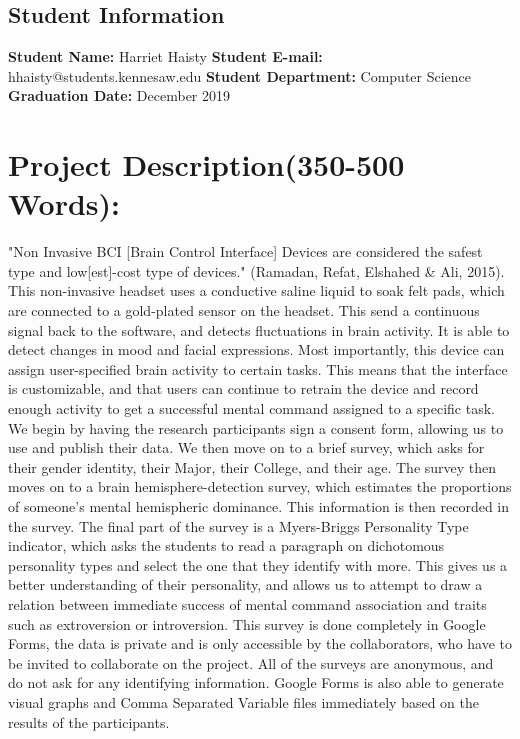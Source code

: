 \documentclass{article}
\begin{document}
\subsection*{Student Information}
\textbf{Student Name:} Harriet Haisty \newline
\textbf{Student E-mail:} hhaisty@students.kennesaw.edu \newline
\textbf{Student Department:} Computer Science \newline
\textbf{Graduation Date:} December 2019

\section*{Project Description(350-500 Words):}
"Non Invasive BCI [Brain Control Interface] Devices are considered the safest type and low[est]-cost type of devices." (Ramadan, Refat, Elshahed & Ali, 2015). This non-invasive headset uses a conductive saline liquid to soak felt pads, which are connected to a gold-plated sensor on the headset. This send a continuous signal back to the software, and detects fluctuations in brain activity. It is able to detect changes in mood and facial expressions. Most importantly, this device can assign user-specified brain activity to certain tasks. This means that the interface is customizable, and that users can continue to retrain the device and record enough activity to get a successful mental command assigned to a specific task. 
\newline \newline
We begin by having the research participants sign a consent form, allowing us to use and publish their data. We then move on to a brief survey, which asks for their gender identity, their Major, their College, and their age. 
\newline \newline
The survey then moves on to a brain hemisphere-detection survey, which estimates the proportions of someone's mental hemispheric dominance. This information is then recorded in the survey.
\newline \newline
The final part of the survey is a Myers-Briggs Personality Type indicator, which asks the students to read a paragraph on dichotomous personality types and select the one that they identify with more. This gives us a better understanding of their personality, and allows us to attempt to draw a relation between immediate success of mental command association and traits such as extroversion or introversion. 
\newline \newline
This survey is done completely in Google Forms, the data is private and is only accessible by the collaborators, who have to be invited to collaborate on the project. All of the surveys are anonymous, and do not ask for any identifying information. Google Forms is also able to generate visual graphs and Comma Separated Variable files immediately based on the results of the participants. 
\end{document}
